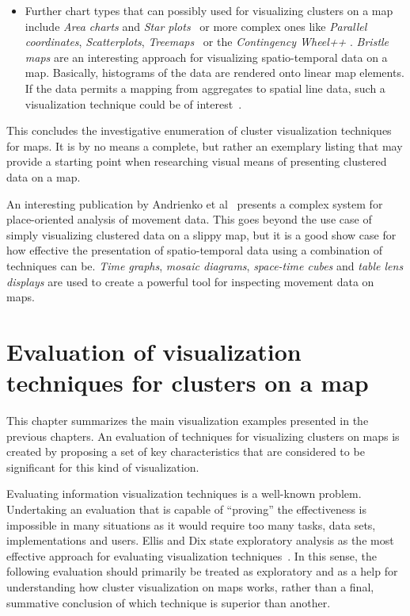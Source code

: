 \begin{itemize}
\begin{itemize}
\item Further chart types that can possibly used for visualizing clusters on a map include \textit{Area charts} and \textit{Star plots}~\cite{ladenhauf12dia} or more complex ones like \textit{Parallel coordinates}, \textit{Scatterplots}, \textit{Treemaps}~\cite{zhang07thesis} or the \textit{Contingency Wheel++} \cite{VAST2012}. \textit{Bristle maps} are an interesting approach for visualizing spatio-temporal data on a map. Basically, histograms of the data are rendered onto linear map elements. If the data permits a mapping from aggregates to spatial line data, such a visualization technique could be of interest~\cite{bristle}.

\end{itemize}

\end{itemize}

This concludes the investigative enumeration of cluster visualization techniques for maps. It is by no means a complete, but rather an exemplary listing that may provide a starting point when researching visual means of presenting clustered data on a map.

An interesting publication by Andrienko et al~\cite{andrienko2012sca} presents a complex system for place-oriented analysis of movement data. This goes beyond the use case of simply visualizing clustered data on a slippy map, but it is a good show case for how effective the presentation of spatio-temporal data using a combination of techniques can be. \textit{Time graphs}, \textit{mosaic diagrams}, \textit{space-time cubes} and \textit{table lens displays} are used to create a powerful tool for inspecting movement data on maps.



\section{Evaluation of visualization techniques for clusters on a map}
\label{chapter:eval-vis}

This chapter summarizes the main visualization examples presented in the previous chapters. An evaluation of techniques for visualizing clusters on maps is created by proposing a set of key characteristics that are considered to be significant for this kind of visualization.

Evaluating information visualization techniques is a well-known problem. Undertaking an evaluation that is capable of ``proving'' the effectiveness is impossible in many situations as it would require too many tasks, data sets, implementations and users. Ellis and Dix state exploratory analysis as the most effective approach for evaluating visualization techniques~\cite{ellis06eval, Delort10vis}. In this sense, the following evaluation should primarily be treated as exploratory and as a help for understanding how cluster visualization on maps works, rather than a final, summative conclusion of which technique is superior than another. 

